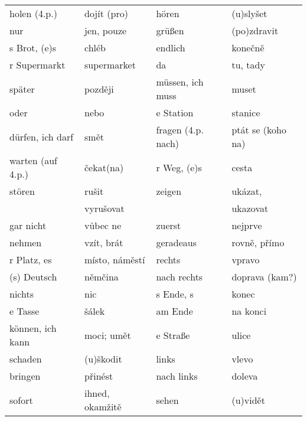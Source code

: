 \begin{table}[ht!]
\begin{tabular}{llll}
          holen (4.p.)  & dojít (pro)      & hören               & (u)slyšet             \\
          nur           & jen, pouze       & grüßen              & (po)zdravit           \\
          s Brot, (e)s  & chléb            & endlich             & konečně               \\
          r Supermarkt  & supermarket      & da                  & tu, tady              \\
          später        & později          & müssen, ich muss    & muset                 \\
          oder          & nebo             & e Station           & stanice               \\
          dürfen, ich darf   & smět        & fragen (4.p. nach)  & ptát se (koho na)     \\
          warten (auf 4.p.)  & čekat(na)   & r Weg, (e)s         & cesta                 \\
          stören        & rušit            & zeigen              & ukázat,               \\
                        & vyrušovat        &                     & ukazovat              \\
          gar nicht     & vůbec ne         & zuerst              & nejprve               \\
          nehmen        & vzít, brát       & geradeaus           & rovně, přímo          \\
          r Platz, es   & místo, náměstí   & rechts              & vpravo                \\
          (s) Deutsch   & němčina          & nach rechts         & doprava (kam?)        \\
          nichts        & nic              & s Ende, s           & konec                 \\
          e Tasse       & šálek            & am Ende             & na konci              \\
          können, ich kann   & moci; umět  & e Straße            & ulice                 \\
          schaden       & (u)škodit        & links               & vlevo                 \\ 
          bringen       & přinést          & nach links          & doleva                \\
          sofort        & ihned, okamžitě  & sehen               & (u)vidět              \\
        \hline       
      \end{tabular}
      \caption*{ }
    \end{table}
  
